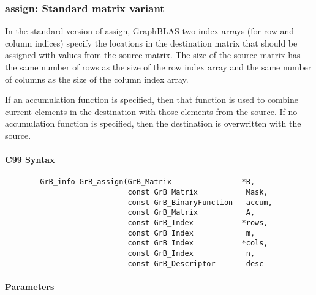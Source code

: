 \subsubsection{{\sf assign}: Standard matrix variant}

In the standard version of {\sf assign}, GraphBLAS two index arrays (for row and
column indices) specify the locations in the destination matrix that should be 
assigned with values from the source matrix.  The size of the source matrix has the same
number of rows as the size of the row index array and the same number
of columns as the size of the column index array.

If an accumulation function is specified, then that function is used
to combine current elements in the destination with those elements
from the source.  If no accumulation function is specified, then the
destination is overwritten with the source.

\paragraph{C99 Syntax}

\begin{verbatim}
        GrB_info GrB_assign(GrB_Matrix                *B,
                            const GrB_Matrix           Mask,
                            const GrB_BinaryFunction   accum,
                            const GrB_Matrix           A,
                            const GrB_Index           *rows,
                            const GrB_Index            m,
                            const GrB_Index           *cols,
                            const GrB_Index            n,
                            const GrB_Descriptor       desc
\end{verbatim}

\paragraph{Parameters}

